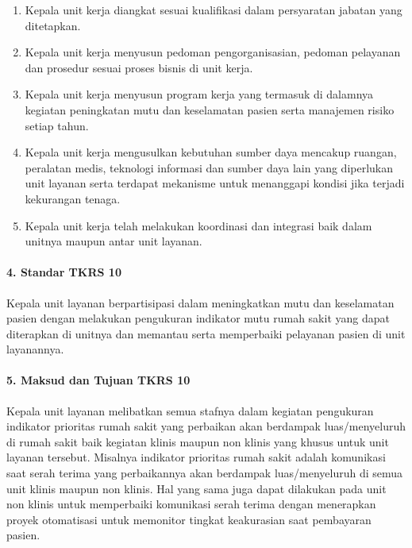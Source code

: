 \documentclass[
]{book}
\providecommand{\tightlist}{%
  \setlength{\itemsep}{0pt}\setlength{\parskip}{0pt}}
\begin{document}
\begin{enumerate}
\def\labelenumi{\alph{enumi}.}
\tightlist
\item
  Kepala unit kerja diangkat sesuai kualifikasi dalam persyaratan jabatan yang ditetapkan.
\item
  Kepala unit kerja menyusun pedoman pengorganisasian, pedoman pelayanan dan prosedur sesuai proses bisnis di unit kerja.
\item
  Kepala unit kerja menyusun program kerja yang termasuk di dalamnya kegiatan peningkatan mutu dan keselamatan pasien serta manajemen risiko setiap tahun.
\item
  Kepala unit kerja mengusulkan kebutuhan sumber daya mencakup ruangan, peralatan medis, teknologi informasi dan sumber daya lain yang diperlukan unit layanan serta terdapat mekanisme untuk menanggapi kondisi jika terjadi kekurangan tenaga.
\item
  Kepala unit kerja telah melakukan koordinasi dan integrasi baik dalam unitnya maupun antar unit layanan.
\end{enumerate}

\hypertarget{standar-tkrs-10}{%
\paragraph*{4. Standar TKRS 10}\label{standar-tkrs-10}}

Kepala unit layanan berpartisipasi dalam meningkatkan mutu dan keselamatan pasien dengan melakukan pengukuran indikator mutu rumah sakit yang dapat diterapkan di unitnya dan memantau serta memperbaiki pelayanan pasien di unit layanannya.

\hypertarget{maksud-dan-tujuan-tkrs-10}{%
\paragraph*{5. Maksud dan Tujuan TKRS 10}\label{maksud-dan-tujuan-tkrs-10}}

Kepala unit layanan melibatkan semua stafnya dalam kegiatan pengukuran indikator prioritas rumah sakit yang perbaikan akan berdampak luas/menyeluruh di rumah sakit baik kegiatan klinis maupun non klinis yang khusus untuk unit layanan tersebut. Misalnya indikator prioritas rumah sakit adalah komunikasi saat serah terima yang perbaikannya akan berdampak luas/menyeluruh di semua unit klinis maupun non klinis. Hal yang sama juga dapat dilakukan pada unit non klinis untuk memperbaiki komunikasi serah terima dengan menerapkan proyek otomatisasi untuk memonitor tingkat keakurasian saat pembayaran pasien.
\end{document}
